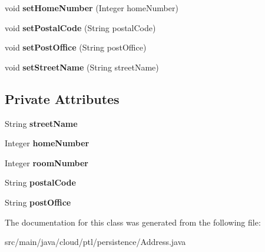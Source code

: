 \begin{DoxyCompactItemize}
void {\bfseries set\+Home\+Number} (Integer home\+Number)
\item 
\mbox{\label{classcloud_1_1ptl_1_1persistence_1_1Address_a3a51d4921cd04b37e501d8a909e2ffbb}} 
void {\bfseries set\+Postal\+Code} (String postal\+Code)
\item 
\mbox{\label{classcloud_1_1ptl_1_1persistence_1_1Address_a02e3d1af0fb3d62ba5fe1478f9e02d74}} 
void {\bfseries set\+Post\+Office} (String post\+Office)
\item 
\mbox{\label{classcloud_1_1ptl_1_1persistence_1_1Address_ae6837d17b8e5b78e81ace9e08e7a648e}} 
void {\bfseries set\+Street\+Name} (String street\+Name)
\end{DoxyCompactItemize}
\subsection*{Private Attributes}
\begin{DoxyCompactItemize}
\item 
\mbox{\label{classcloud_1_1ptl_1_1persistence_1_1Address_a77469e220f9c70512deb596be619371b}} 
String {\bfseries street\+Name}
\item 
\mbox{\label{classcloud_1_1ptl_1_1persistence_1_1Address_a24180fd7276a5d82860a3e3451356095}} 
Integer {\bfseries home\+Number}
\item 
\mbox{\label{classcloud_1_1ptl_1_1persistence_1_1Address_a56795b86edf1fa64f90a903102f5e572}} 
Integer {\bfseries room\+Number}
\item 
\mbox{\label{classcloud_1_1ptl_1_1persistence_1_1Address_af10b444d134b57e130f4bdf9fc4b0065}} 
String {\bfseries postal\+Code}
\item 
\mbox{\label{classcloud_1_1ptl_1_1persistence_1_1Address_a5606e0bd6c390bc1f562ac8db4661a3a}} 
String {\bfseries post\+Office}
\end{DoxyCompactItemize}


The documentation for this class was generated from the following file\+:\begin{DoxyCompactItemize}
\item 
src/main/java/cloud/ptl/persistence/Address.\+java\end{DoxyCompactItemize}
